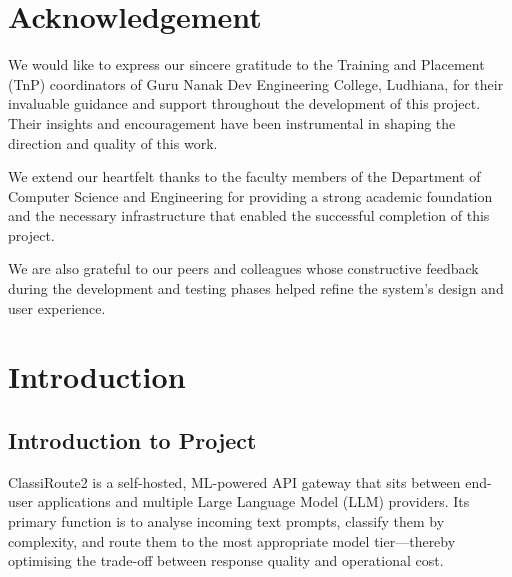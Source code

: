 \documentclass[12pt,a4paper]{report}
\begin{document}
\chapter*{Acknowledgement}

We would like to express our sincere gratitude to the Training and Placement (TnP) coordinators of Guru Nanak Dev Engineering College, Ludhiana, for their invaluable guidance and support throughout the development of this project. Their insights and encouragement have been instrumental in shaping the direction and quality of this work.

We extend our heartfelt thanks to the faculty members of the Department of Computer Science and Engineering for providing a strong academic foundation and the necessary infrastructure that enabled the successful completion of this project.

We are also grateful to our peers and colleagues whose constructive feedback during the development and testing phases helped refine the system's design and user experience.

\listoffigures
{}

\listoftables
{}

\tableofcontents
{}

\clearpage

\chapter{Introduction}

\section{Introduction to Project}

ClassiRoute2 is a self-hosted, ML-powered API gateway that sits between end-user applications and multiple Large Language Model (LLM) providers. Its primary function is to analyse incoming text prompts, classify them by complexity, and route them to the most appropriate model tier---thereby optimising the trade-off between response quality and operational cost.
\end{document}

